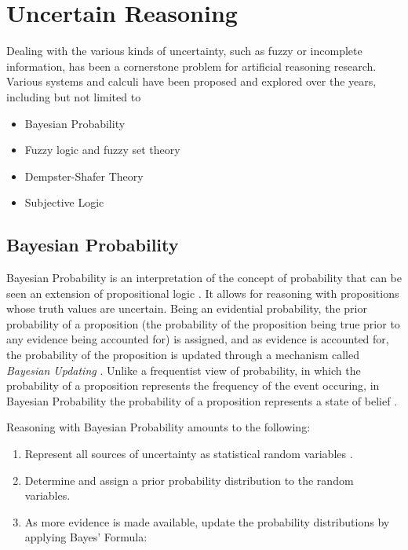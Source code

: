 \documentclass[thesis.tex]{subfiles}
\begin{document}
\section{Uncertain Reasoning}
\label{sec:uncertain-reasoning}

%
%

Dealing with the various kinds of uncertainty, such as fuzzy or incomplete information,
has been a cornerstone problem for artificial reasoning research. Various systems and
calculi have been proposed and explored over the years, including but not limited to

\begin{itemize}
  \item Bayesian Probability
  \item Fuzzy logic and fuzzy set theory
  \item Dempster-Shafer Theory
  \item Subjective Logic
\end{itemize}



%
%



\subsection{Bayesian Probability}

Bayesian Probability is an interpretation of the concept of probability that
can be seen an extension of propositional logic \cite{carnap1962logical}. It allows for reasoning with
propositions whose truth values are uncertain. Being an evidential probability,
the prior probability of a proposition (the probability of the proposition being
true prior to any evidence being accounted for) is assigned, and as evidence is
accounted for, the probability of the proposition is updated through a mechanism
called \emph{Bayesian Updating} \cite{paulos2011mathematics}. Unlike a frequentist
view of probability, in which the probability of a proposition represents the frequency
of the event occuring, in Bayesian Probability the probability of a proposition
represents a state of belief \cite{de1977theory}.

Reasoning with Bayesian Probability amounts to the following:

\begin{enumerate}
  \item Represent all sources of uncertainty as statistical random variables \cite{dupre2009new}.
  \item Determine and assign a prior probability distribution to the random variables.
  \item As more evidence is made available, update the probability distributions by applying Bayes' Formula:
\end{enumerate}
\end{document}
